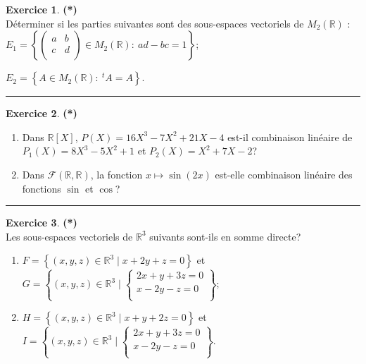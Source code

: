 \documentclass[a4paper,11pt]{article}
\theoremstyle{definition}
\newtheorem{exo}{Exercice} %
\begin{document}
    
\begin{minipage}{1\linewidth}\begin{minipage}[t]{0.48\linewidth}\raggedright
		
\begin{exo}\textbf{(*)}\quad\\[0.2cm]
Déterminer si les parties suivantes sont des sous-espaces vectoriels de $M_2(\mathbb R)$ : 
 $E_1=\left\{\begin{pmatrix}
	a & b \\
	c & d \\
	\end{pmatrix}\in M_2(\mathbb R):\ ad-bc=1\right\}$;
	

$E_2=\left\{A\in M_2(\mathbb R):\ {}^tA=A\right\}$.

\centering\rule{1\linewidth}{0.6pt}\end{exo}
		
		
\begin{exo}\textbf{(*)}\quad\\[0.2cm]
\begin{enumerate}
	\item Dans $\mathbb R[X]$, $P(X)=16X^3-7X^2+21X-4$ est-il combinaison linéaire de $P_1(X)=8X^3-5X^2+1$ et $P_2(X)=X^2+7X-2$?
	\item Dans $\mathcal F(\mathbb R,\mathbb R)$, la fonction $x\mapsto \sin(2x)$ est-elle combinaison linéaire des fonctions $\sin$ et $\cos$?
\end{enumerate}

\centering\rule{1\linewidth}{0.6pt}\end{exo}
		
		
\begin{exo}\textbf{(*)}\quad\\[0.2cm]
Les sous-espaces vectoriels de $\mathbb R^3$ suivants sont-ils en somme directe?
\begin{enumerate}
	\item $F=\left\{(x,y,z)\in \mathbb R^3\mid x+2y+z=0\right\}$ et $G=\left\{(x,y,z)\in \mathbb R^3\mid \left\{\begin{array}{l}
	2x + y + 3z = 0 \\
	x - 2y - z = 0 \\
	\end{array}\right.\right\}$; 
	\item $H=\left\{(x,y,z)\in \mathbb R^3\mid x+y+2z=0\right\}$ et $I=\left\{(x,y,z)\in \mathbb R^3\mid \left\{\begin{array}{l}
	2x + y + 3z = 0 \\
	x - 2y - z = 0 \\
	\end{array}\right.\right\}$.
\end{enumerate}


\end{exo}
\end{minipage}
\end{minipage}
\end{document}
